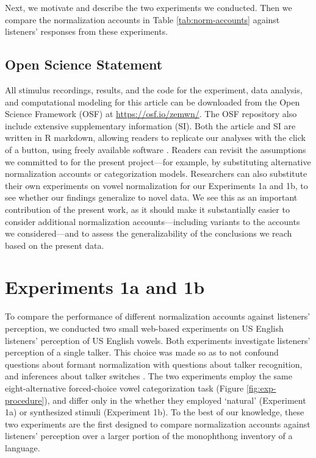 \documentclass[preprint]{JASA}
\begin{document}
\linenumbers

Next, we motivate and describe the two experiments we conducted. Then we compare the normalization accounts in Table \ref{tab:norm-accounts} against listeners' responses from these experiments.

\subsection{Open Science Statement}\label{open-science-statement}

All stimulus recordings, results, and the code for the experiment, data analysis, and computational modeling for this article can be downloaded from the Open Science Framework (OSF) at \url{https://osf.io/zemwn/}. The OSF repository also include extensive supplementary information (SI). Both the article and SI are written in R markdown, allowing readers to replicate our analyses with the click of a button, using freely available software \citep{R-base, RStudio}. Readers can revisit the assumptions we committed to for the present project---for example, by substituting alternative normalization accounts or categorization models. Researchers can also substitute their own experiments on vowel normalization for our Experiments 1a and 1b, to see whether our findings generalize to novel data. We see this as an important contribution of the present work, as it should make it substantially easier to consider additional normalization accounts---including variants to the accounts we considered---and to assess the generalizability of the conclusions we reach based on the present data.

\section{Experiments 1a and 1b}\label{sec:experiment}

To compare the performance of different normalization accounts against listeners' perception, we conducted two small web-based experiments on US English listeners' perception of US English vowels. Both experiments investigate listeners' perception of a single talker. This choice was made so as to not confound questions about formant normalization with questions about talker recognition, and inferences about talker switches \citep{magnuson-nusbaum2007}. The two experiments employ the same eight-alternative forced-choice vowel categorization task (Figure \ref{fig:exp-procedure}), and differ only in the whether they employed `natural' (Experiment 1a) or synthesized stimuli (Experiment 1b). To the best of our knowledge, these two experiments are the first designed to compare normalization accounts against listeners' perception over a larger portion of the monophthong inventory of a language.
\end{document}
